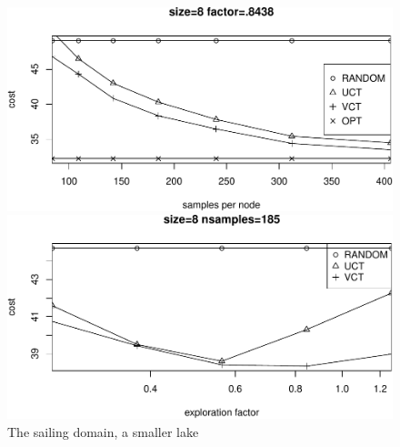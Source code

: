 \documentclass{article}
\begin{document}
\begin{figure}[t]
  \begin{minipage}[b]{0.5\linewidth} \centering
    \includegraphics[scale=0.45,trim=0pt 0pt 0pt
    0pt,clip]{sailing-size=8-factor=_8438.pdf}
  \end{minipage}
  \begin{minipage}[b]{0.5\linewidth} \centering
    \includegraphics[scale=0.45,trim=0pt 0pt 0pt
    0pt,clip]{sailing-size=8-nsamples=185.pdf}
  \end{minipage}
  \caption{The sailing domain, a smaller lake}
  \label{fig:sailing-8}
\end{figure}
\end{document}
